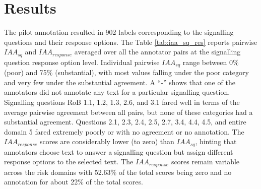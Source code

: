 \documentclass{IOS-Book-Article}
\begin{document}
\section{Results}
\label{sec:results}
%
The pilot annotation resulted in 902 labels corresponding to the signalling questions and their response options.
The Table \ref{tab:iaa_sq_res} reports pairwise $IAA_{sq}$ and $IAA_{response}$ averaged over all the annotator pairs at the signalling question response option level.
Individual pairwise $IAA_{sq}$ range between 0\% (poor) and 75\% (substantial), with most values falling under the poor category and very few under the substantial agreement.
A ``-'' shows that one of the annotators did not annotate any text for a particular signalling question. 
Signalling questions RoB 1.1, 1.2, 1.3, 2.6, and 3.1 fared well in terms of the average pairwise agreement between all pairs, but none of these categories had a substantial agreement.
Questions 2.1, 2.3, 2.4, 2.5, 2.7, 3.4, 4.4, 4.5, and entire domain 5 fared extremely poorly or with no agreement or no annotation.
The $IAA_{response}$ scores are considerably lower (to zero) than $IAA_{sq}$, hinting that annotators choose text to answer a signalling question but assign different response options to the selected text. 
The $IAA_{response}$ scores remain variable across the risk domains with 52.63\% of the total scores being zero and no annotation for about 22\% of the total scores.
%
\end{document}
